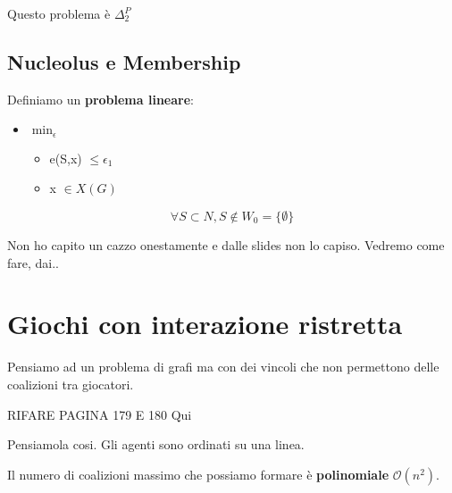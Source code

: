Questo problema è \textbf{$\Delta^P_2$}

\subsection{Nucleolus e Membership}

Definiamo un \textbf{problema lineare}:

\begin{itemize}
    \item $\min_\epsilon$
          \begin{itemize}
              \item e(S,x) $\leq \epsilon_1$
              \item x $\in X(G)$
          \end{itemize}
\end{itemize}

\[
    \forall S \subset N, S \notin W_0 = \{\emptyset\}
\]

Non ho capito un cazzo onestamente e dalle slides non lo capiso. Vedremo come
fare, dai..

\section{Giochi con interazione ristretta}

Pensiamo ad un problema di grafi ma con dei vincoli che non permettono delle
coalizioni tra giocatori.

RIFARE PAGINA 179 E 180 Qui

Pensiamola cosi. Gli agenti sono ordinati su una linea.

\begin{figure}[H]
    \begin{center}


    \end{center}
\end{figure}
Il numero di coalizioni massimo che possiamo formare è \textbf{polinomiale} $\mathcal{O}(n^2)$.

